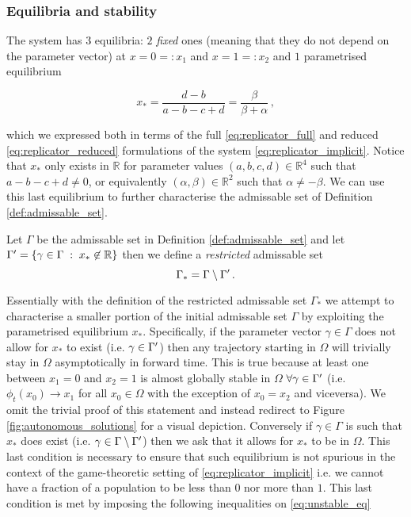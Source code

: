 \documentclass[../main.tex]{subfiles}
\begin{document}
\subsubsection{Equilibria and stability}\label{subsubsec:equilibria}

The system has $3$ equilibria: $2$ \textit{fixed} ones (meaning that they do not depend on the parameter vector) at $x=0=:x_{1}$ and $x=1=:x_{2}$ and $1$ parametrised equilibrium 

\begin{equation}\label{eq:unstable_eq}
     x_{*} = \frac{d-b}{a-b-c+d} = \frac{\beta}{\beta + \alpha}\,,
\end{equation}

which we expressed both in terms of the full \eqref{eq:replicator_full} and reduced \eqref{eq:replicator_reduced} formulations of the system \eqref{eq:replicator_implicit}.
Notice that $x_{*}$ only exists in $\mathbb{R}$ for parameter values $(a,b,c,d)\in \mathbb{R}^{4}$ such that $a - b - c + d \neq 0$, or equivalently $(\alpha,\beta)\in \mathbb{R}^{2}$ such that $\alpha\neq-\beta$.
We can use this last equilibrium to further characterise the admissable set of Definition \ref{def:admissable_set}.

\begin{definition}[]\label{def:restricted_admissable_set}
        Let $\Gamma$ be the admissable set in Definition \ref{def:admissable_set} and let $\Gamma' = \{\gamma\in\Gamma \;:\; x_{*}\not\in\mathbb{R}\}$ then we define a \textit{restricted} admissable set
        \begin{equation*}
                \Gamma_{*} = \Gamma\setminus\Gamma'\,. 
        \end{equation*}
\end{definition}

Essentially with the definition of the restricted admissable set $\Gamma_{*}$ we attempt to characterise a smaller portion of the initial admissable set $\Gamma$ by exploiting the parametrised equilibrium $x_{*}$.
Specifically, if the parameter vector $\gamma\in\Gamma$ does not allow for $x_{*}$ to exist (i.e. $\gamma\in \Gamma'$) then any trajectory starting in $\Omega$ will trivially stay in $\Omega$  asymptotically in forward time.
This is true because at least one between $x_{1} = 0$ and $x_{2} = 1$ is almost globally stable in $\Omega$ $\forall\gamma\in\Gamma'$ (i.e. $\phi_{t}(x_{0})\to x_{1}$ for all $x_{0}\in\Omega$ with the exception of $x_{0}=x_{2}$ and viceversa).
We omit the trivial proof of this statement and instead redirect to Figure \ref{fig:autonomous_solutions} for a visual depiction.
Conversely if $\gamma\in\Gamma$ is such that $x_{*}$ does exist (i.e. $\gamma\in\Gamma\setminus \Gamma'$) then we ask that it allows for $x_{*}$ to be in $\Omega$.
This last condition is necessary to ensure that such equilibrium is not spurious in the context of the game-theoretic setting of \eqref{eq:replicator_implicit} i.e. we cannot have a fraction of a population to be less than $0$ nor more than $1$.
This last condition is met by imposing the following inequalities on \eqref{eq:unstable_eq}
\end{document}
